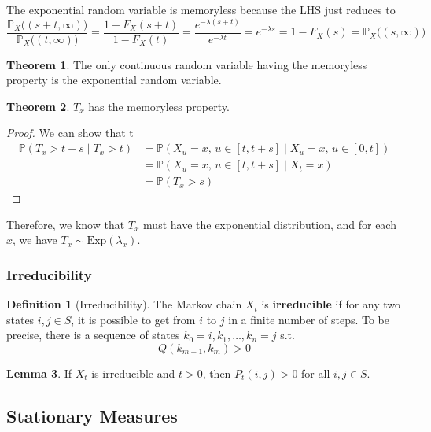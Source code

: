 \documentclass{article}
\theoremstyle{definition}
\newtheorem{theorem}{Theorem}[section]
\newtheorem{lemma}[theorem]{Lemma}
\theoremstyle{remark}
\theoremstyle{definition}
\newtheorem{definition}{Definition}[section]
\begin{document}
The exponential random variable is memoryless because the LHS just reduces to 
\[\frac{\mathbb{P}_X \big( (s + t, \infty) \big)}{\mathbb{P}_X \big( (t, \infty) \big)} = \frac{1 - F_X (s + t)}{1 - F_X (t)} = \frac{e^{-\lambda(s + t)}}{e^{-\lambda t}} = e^{-\lambda s} = 1 - F_X (s) = \mathbb{P}_X \big( (s, \infty) \big) \]

\begin{theorem}
The only continuous random variable having the memoryless property is the exponential random variable. 
\end{theorem}

\begin{theorem}
$T_x$ has the memoryless property. 
\end{theorem}
\begin{proof}
We can show that t
\begin{align*}
    \mathbb{P}(T_x > t + s \mid T_x > t) & = \mathbb{P}(X_u = x, \, u \in [t, t + s] \mid X_u = x, \, u \in [0, t]) \\
    & = \mathbb{P}(X_u = x, \, u \in [t, t + s] \mid X_t = x) \\
    & = \mathbb{P}(T_x > s) 
\end{align*}
\end{proof}

Therefore, we know that $T_x$ must have the exponential distribution, and for each $x$, we have $T_x \sim \mathrm{Exp}(\lambda_x)$. 

\subsubsection{Irreducibility}

\begin{definition}[Irreducibility]
The Markov chain $X_t$ is \textbf{irreducible} if for any two states $i, j \in S$, it is possible to get from $i$ to $j$ in a finite number of steps. To be precise, there is a sequence of states $k_0 = i, k_1, \ldots, k_n = j$ s.t. 
\[Q(k_{m-1}, k_m) > 0\]
\end{definition}

\begin{lemma}
If $X_t$ is irreducible and $t > 0$, then $P_t (i, j) > 0$ for all $i, j \in S$. 
\end{lemma}

\subsection{Stationary Measures}
\end{document}
